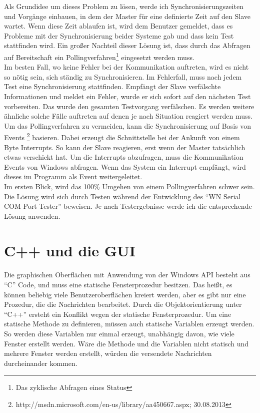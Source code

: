 Als Grundidee um dieses Problem zu lösen, werde ich Synchronisierungszeiten und Vorgänge einbauen, in dem der Master für eine definierte Zeit auf den Slave wartet. Wenn diese Zeit ablaufen ist, wird dem Benutzer gemeldet, dass es Probleme mit der Synchronisierung beider Systeme gab und dass kein Test stattfinden wird. Ein großer Nachteil dieser Lösung ist, dass durch das Abfragen auf Bereitschaft ein Pollingverfahren\footnote{Das zyklische Abfragen eines Status} eingesetzt werden muss. \\


Im besten Fall, wo keine Fehler bei der Kommunikation auftreten, wird es nicht so nötig sein, sich ständig zu Synchronisieren. Im Fehlerfall, muss nach jedem Test eine Synchronisierung stattfinden. Empfängt der Slave verfälschte Informationen und meldet ein Fehler, wurde er sich sofort auf den nächsten Test vorbereiten. Das wurde den gesamten Testvorgang verfälschen. Es werden weitere ähnliche solche Fälle auftreten auf denen je nach Situation reagiert werden muss.\\


Um das Pollingverfahren zu vermeiden, kann die Synchronisierung auf Basis von Events \footnote{http://msdn.microsoft.com/en-us/library/aa450667.aspx; 30.08.2013} basieren. Dabei erzeugt die Schnittstelle bei der Ankunft von einem Byte Interrupts. So kann der Slave reagieren, erst wenn der Master tatsächlich etwas verschickt hat. Um die Interrupts abzufragen, muss die Kommunikation Events von Windows abfragen. Wenn das System ein Interrupt empfängt, wird dieses im Programm als Event weitergeleitet.\\


Im ersten Blick, wird das 100\% Umgehen von einem Pollingverfahren schwer sein. Die Lösung wird sich durch Testen während der Entwicklung des "`WN Serial COM Port Tester"' beweisen. Je nach Testergebnisse werde ich die entsprechende Lösung anwenden.


\section{C++ und die GUI}\label{C++GUILoesung}
\paragraph{}
Die graphischen Oberflächen mit Anwendung von der Windows API besteht aus "`C"' Code, und muss eine statische Fensterprozedur besitzen. Das heißt, es können beliebig viele Benutzeroberflächen kreiert werden, aber es gibt nur eine Prozedur, die die Nachrichten bearbeitet. Durch die Objektorientierung unter "`C++"' ersteht ein Konflikt wegen der statische Fensterprozedur. Um eine statische Methode zu definieren, müssen auch statische Variablen erzeugt werden. So werden diese Variablen nur einmal erzeugt, unabhängig davon, wie viele Fenster erstellt werden. Wäre die Methode und die Variablen nicht statisch und mehrere Fenster werden erstellt, würden die versendete Nachrichten durcheinander kommen.\\


